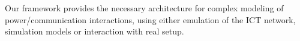 \documentclass[conference]{IEEEtran}
\begin{document}
Our framework provides the necessary architecture for complex modeling of power/communication interactions, using either emulation of the ICT network, simulation models or interaction with real setup.

\end{document}

